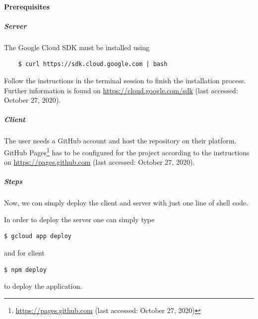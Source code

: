 \paragraph{Prerequisites}   

\subparagraph{Server}
The Google Cloud SDK must be installed using 
\begin{verbatim}
    $ curl https://sdk.cloud.google.com | bash
\end{verbatim}
Follow the instructions in the terminal session to finish the installation process. Further information is found on \url{https://cloud.google.com/sdk} (last accessed: October 27, 2020).

\subparagraph{Client}
The user needs a GitHub account and host the repository on their platform. GitHub Pages\footnote{\url{https://pages.github.com} (last accessed: October 27, 2020)} has to be configured for the project according to the instructions on \url{https://pages.github.com} (last accessed: October 27, 2020).

\subparagraph{Steps}
Now, we can simply deploy the client and server with just one line of shell code.

In order to deploy the server one can simply type
\begin{verbatim}
$ gcloud app deploy
\end{verbatim}
and for client
\begin{verbatim}
$ npm deploy
\end{verbatim}
to deploy the application.